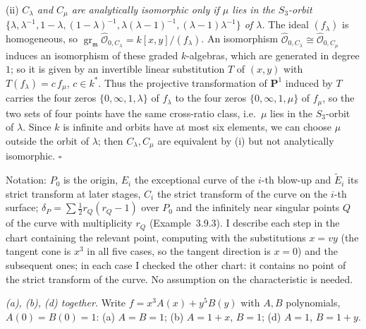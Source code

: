 \documentclass[11pt]{article}
\begin{document}
(ii) \emph{$C_\lambda$ and $C_\mu$ are analytically isomorphic only if $\mu$ lies in the $S_3$-orbit $\{\lambda,\lambda^{-1},1-\lambda,(1-\lambda)^{-1},\lambda(\lambda-1)^{-1},(\lambda-1)\lambda^{-1}\}$ of $\lambda$.} The ideal $(f_\lambda)$ is homogeneous, so $\operatorname{gr}_{\mathfrak m}\widehat{\mathcal O}_{0,C_\lambda}=k[x,y]/(f_\lambda)$. An isomorphism $\widehat{\mathcal O}_{0,C_\lambda}\cong\widehat{\mathcal O}_{0,C_\mu}$ induces an isomorphism of these graded $k$-algebras, which are generated in degree $1$; so it is given by an invertible linear substitution $T$ of $(x,y)$ with $T(f_\lambda)=c\,f_\mu$, $c\in k^*$. Thus the projective transformation of $\mathbf P^1$ induced by $T$ carries the four zeros $\{0,\infty,1,\lambda\}$ of $f_\lambda$ to the four zeros $\{0,\infty,1,\mu\}$ of $f_\mu$, so the two sets of four points have the same cross-ratio class, i.e.\ $\mu$ lies in the $S_3$-orbit of $\lambda$. Since $k$ is infinite and orbits have at most six elements, we can choose $\mu$ outside the orbit of $\lambda$; then $C_\lambda,C_\mu$ are equivalent by (i) but not analytically isomorphic. \hfill$\square$

\pf
Notation: $P_0$ is the origin, $E_i$ the exceptional curve of the $i$-th blow-up and $\widetilde E_i$ its strict transform at later stages, $C_i$ the strict transform of the curve on the $i$-th surface; $\delta_P=\sum\frac12 r_Q(r_Q-1)$ over $P_0$ and the infinitely near singular points $Q$ of the curve with multiplicity $r_Q$ (Example~3.9.3). I describe each step in the chart containing the relevant point, computing with the substitutions $x=vy$ (the tangent cone is $x^3$ in all five cases, so the tangent direction is $x=0$) and the subsequent ones; in each case I checked the other chart: it contains no point of the strict transform of the curve. No assumption on the characteristic is needed.

\emph{(a), (b), (d) together.} Write $f=x^3A(x)+y^5B(y)$ with $A,B$ polynomials, $A(0)=B(0)=1$: (a) $A=B=1$; (b) $A=1+x$, $B=1$; (d) $A=1$, $B=1+y$.
\end{document}

